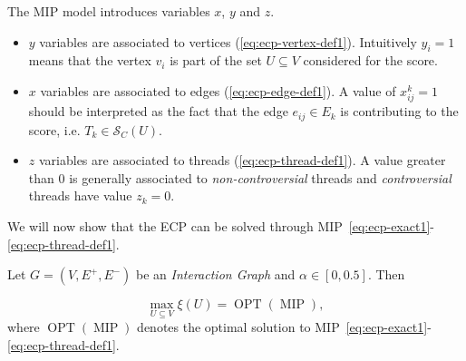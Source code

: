 The \acrshort{MIP} model introduces variables $x$, $y$ and $z$.
\begin{itemize}
	\item $y$ variables are associated to vertices
	      (\autoref{eq:ecp-vertex-def1}). Intuitively $y_i = 1$ means that the
	      vertex $v_{i} $ is part of the set $U \subseteq V$ considered for the
	      score.
	\item $x$ variables are associated to edges (\autoref{eq:ecp-edge-def1}).
	      A value of $x_{ij}^{k} = 1$ should be interpreted as the fact that
	      the edge $e_{ij} \in E_k$ is contributing to the score,
	      i.e. $T_k \in \mathcal{S}_{C} (U)$.
	\item $z$ variables are associated to threads
	      (\autoref{eq:ecp-thread-def1}). A value greater than 0
	      is generally associated to \emph{non-controversial} threads and
	      \emph{controversial} threads have value $z_k = 0$.
\end{itemize}

We will now show that the \acrshort{ECP} can be solved through
MIP~\eqref{eq:ecp-exact1}-\eqref{eq:ecp-thread-def1}.

\begin{theorem}
	\label{th:ecp-mip}
	Let $G = (V, E^{+}, E^{-})$ be an \emph{Interaction Graph} and $\alpha \in
		[0, 0.5]$. Then

	\begin{equation}
		\max_{U \subseteq V} \xi(U) = \operatorname{OPT}(\operatorname{MIP}),
	\end{equation}
	where $\operatorname{OPT}(\operatorname{MIP})$ denotes the optimal solution to
	MIP~\eqref{eq:ecp-exact1}-\eqref{eq:ecp-thread-def1}.
\end{theorem}

